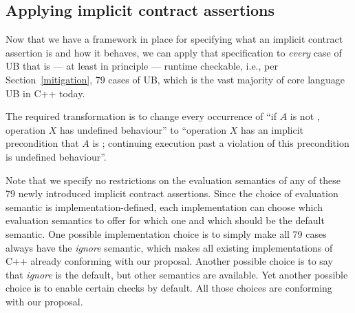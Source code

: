 \subsection{Applying implicit contract assertions}
\label{applyicas}

Now that we have a framework in place for specifying what an implicit contract assertion is and how it behaves, we can apply that specification to \emph{every} case of UB  that is --- at least in principle --- runtime checkable, i.e., per Section~\ref{mitigation}, 79 cases of UB, which is the vast majority of core language UB in C++ today.

The required transformation is to change every occurrence of “if $A$ is not , operation $X$ has undefined behaviour'' to ``operation $X$ has an implicit precondition that $A$ is ; continuing execution past a violation of this precondition is undefined behaviour''.

Note that we specify no restrictions on the evaluation semantics of any of these 79 newly introduced  implicit contract assertions. Since the choice of evaluation semantic is implementation-defined, each implementation can choose which evaluation semantics to offer for which one and which should be the default semantic. One possible implementation choice is to simply make all 79 cases always have the \emph{ignore} semantic, which makes all existing implementations of C++ already conforming with our proposal. Another possible choice is to say that  \emph{ignore} is the default, but other semantics are available. Yet another possible choice is to enable certain checks by default. All those choices are conforming with our proposal.

